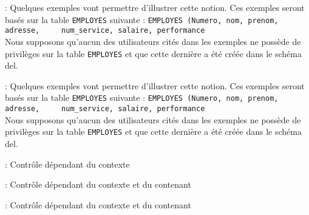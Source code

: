 \documentclass[10pt]{beamer}
\begin{document}
\begin{frame}{\secname : \subsecname}
    Quelques exemples vont permettre d'illustrer cette notion.  Ces exemples seront basés sur la table \lstinline[language=plsql]!EMPLOYES! suivante :
    \lstinline[language=plsql]!EMPLOYES (Numero, nom, prenom, adresse,
    num_service, salaire, performance!\\
    Nous supposons qu'aucun des utilisateurs cités dans les exemples ne possède de privilèges sur la table \lstinline[language=plsql]!EMPLOYES! et que cette dernière a été créée dans le schéma del.
\end{frame}

\begin{frame}{\secname : \subsecname}
    Quelques exemples vont permettre d'illustrer cette notion.  Ces exemples seront basés sur la table \lstinline[language=plsql]!EMPLOYES! suivante :
    \lstinline[language=plsql]!EMPLOYES (Numero, nom, prenom, adresse,
    num_service, salaire, performance!\\
    Nous supposons qu'aucun des utilisateurs cités dans les exemples ne possède de privilèges sur la table \lstinline[language=plsql]!EMPLOYES! et que cette dernière a été créée dans le schéma del.
\end{frame}

\begin{frame}{\secname : \subsecname}
    Contrôle dépendant du contexte
    
\end{frame}

\begin{frame}{\secname : \subsecname}
    Contrôle dépendant du contexte et du contenant
    
\end{frame}

\begin{frame}{\secname : \subsecname}
    Contrôle dépendant du contexte et du contenant
    
\end{frame}
\end{document}
